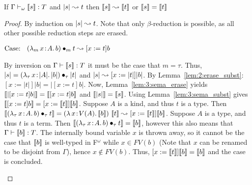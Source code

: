 \begin{lemma}
    \label{lem:3:sema_erase_red_step}
    If $\Gamma \vdash_\omega \llbracket s \rrbracket : T$ and $|s| \leadsto t$ then $\llbracket s \rrbracket \leadsto \llbracket t \rrbracket$ or $\llbracket s \rrbracket = \llbracket t \rrbracket$
\end{lemma}
\begin{proof}
    By induction on $|s| \leadsto t$.
    Note that only $\beta$-reduction is possible, as all other possible reduction steps are erased.

    $\text{Case: }\begin{array}{c} ({\lambda_m}\, x\! : \! A.\, b) \bullet_{m} t \leadsto [x := t]b \end{array}$
    \begin{proofcase}
        By inversion on $\Gamma \vdash \llbracket s \rrbracket : T$ it must be the case that $m = \tau$.
        Thus, $|s| = ({\lambda_\tau}\, x\! : \! |A|.\, |b|) \bullet_{\tau} |t|$ and $|s| \leadsto [x := |t|]|b|$.
        By Lemma~\ref{lem:2:erase_subst}: $[x := |t|]|b| = |[x := t]b|$.
        Now, Lemma~\ref{lem:3:sema_erase} yields $\llbracket |[x := t]b| \rrbracket = \llbracket [x := t]b \rrbracket$ and $\llbracket |s| \rrbracket = \llbracket s \rrbracket$.
        Using Lemma~\ref{lem:3:sema_subst} gives $\llbracket [x := t]b \rrbracket = [x := \llbracket t \rrbracket]\llbracket b \rrbracket$.
        Suppose $A$ is a kind, and thus $t$ is a type.
        Then $\llbracket ({\lambda_\tau}\, x\! : \! A.\, b) \bullet_{\tau} t \rrbracket = ({\lambda}\, x\! : \! V(A).\, \llbracket b \rrbracket)\ \llbracket t \rrbracket \leadsto [x := \llbracket t \rrbracket] \llbracket b \rrbracket$.
        Suppose $A$ is a type, and thus $t$ is a term.
        Then $\llbracket ({\lambda_\tau}\, x\! : \! A.\, b) \bullet_{\tau} t \rrbracket = \llbracket b \rrbracket$, however this also means that $\Gamma \vdash \llbracket b \rrbracket : T$.
        The internally bound variable $x$ is thrown away, so it cannot be the case that $\llbracket b \rrbracket$ is well-typed in F$^\omega$ while $x \in FV(b)$ (Note that $x$ can be renamed to be disjoint from $\Gamma$), hence $x \notin FV(b)$.
        Thus, $[x := \llbracket t \rrbracket] \llbracket b \rrbracket = \llbracket b \rrbracket$ and the case is concluded.
    \end{proofcase}


\end{proof}

